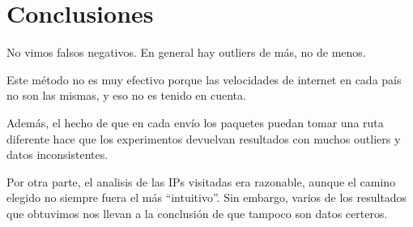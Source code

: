 \section{Conclusiones}

No vimos falsos negativos. En general hay outliers de más, no de menos. 

Este método no es muy efectivo porque las velocidades de internet en cada país no son las mismas, y eso no es tenido en cuenta.

Además, el hecho de que en cada envío los paquetes puedan tomar una ruta diferente hace que los experimentos devuelvan resultados con muchos outliers y datos inconsistentes.

Por otra parte, el analisis de las IPs visitadas era razonable, aunque el camino elegido no siempre fuera el más ``intuitivo''. Sin embargo, varios de los resultados que obtuvimos nos llevan a la conclusión de que tampoco son datos certeros.